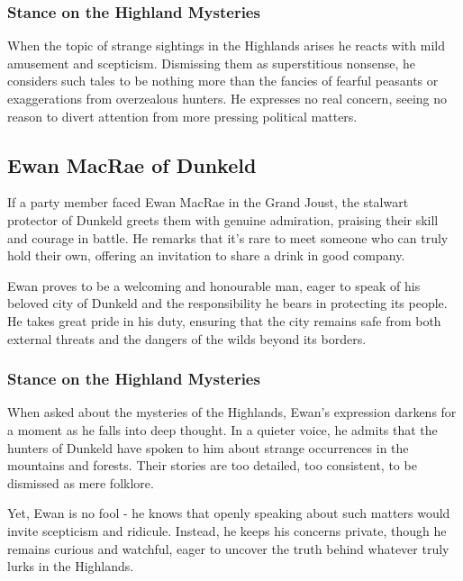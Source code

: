 \subsubsection*{Stance on the Highland Mysteries}
{\entryfont When the topic of strange sightings in the Highlands arises he reacts with mild amusement and scepticism. Dismissing them as superstitious nonsense, he considers such tales to be nothing more than the fancies of fearful peasants or exaggerations from overzealous hunters. He expresses no real concern, seeing no reason to divert attention from more pressing political matters.}
\subsection*{Ewan MacRae of Dunkeld}
{\entryfont If a party member faced Ewan MacRae in the Grand Joust, the stalwart protector of Dunkeld greets them with genuine admiration, praising their skill and courage in battle. He remarks that it's rare to meet someone who can truly hold their own, offering an invitation to share a drink in good company.

Ewan proves to be a welcoming and honourable man, eager to speak of his beloved city of Dunkeld and the responsibility he bears in protecting its people. He takes great pride in his duty, ensuring that the city remains safe from both external threats and the dangers of the wilds beyond its borders.}
\subsubsection*{Stance on the Highland Mysteries}
{\entryfont When asked about the mysteries of the Highlands, Ewan's expression darkens for a moment as he falls into deep thought. In a quieter voice, he admits that the hunters of Dunkeld have spoken to him about strange occurrences in the mountains and forests. Their stories are too detailed, too consistent, to be dismissed as mere folklore.

Yet, Ewan is no fool - he knows that openly speaking about such matters would invite scepticism and ridicule. Instead, he keeps his concerns private, though he remains curious and watchful, eager to uncover the truth behind whatever truly lurks in the Highlands.}
